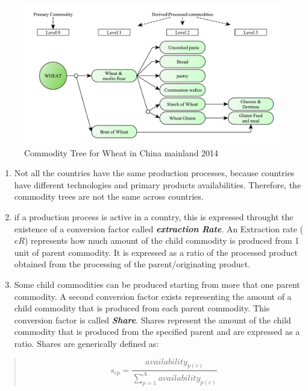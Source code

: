 \documentclass[]{article}
\begin{document}
\begin{figure}[H]

{\centering \includegraphics{images/02_WheatTree} 

}

\caption{\label{fig:f2}Commodity Tree for Wheat in China mainland 2014}\label{fig:f2}
\end{figure}

\begin{enumerate}
\def\labelenumi{\arabic{enumi}.}
\setcounter{enumi}{1}
\item
  Not all the countries have the same production processes, because
  countries have different technologies and primary products
  availabilities. Therefore, the commodity trees are not the same across
  countries.
\item
  if a production process is active in a country, this is expressed
  throught the existence of a conversion factor called
  \textbf{\emph{extraction Rate}}. An Extraction rate (\(eR\))
  represents how much amount of the child commodity is produced from 1
  unit of parent commodity. It is expressed as a ratio of the processed
  product obtained from the processing of the parent/originating
  product.
\item
  Some child commodities can be produced starting from more that one
  parent commodity. A second conversion factor exists representing the
  amount of a child commodity that is produced from each parent
  commodity. This conversion factor is called \textbf{\emph{Share}}.
  Shares represent the amount of the child commodity that is produced
  from the specified parent and are expressed as a ratio. Shares are
  generically defined as:
\end{enumerate}

\begin{quote}
\begin{equation}
\label{eq:sharesGen}
s_{cp} = \frac{availability_{p(c)}}{\sum \limits_{p=1}^A{availability_{p(c)}}}
\end{equation}
\end{quote}
\end{document}
